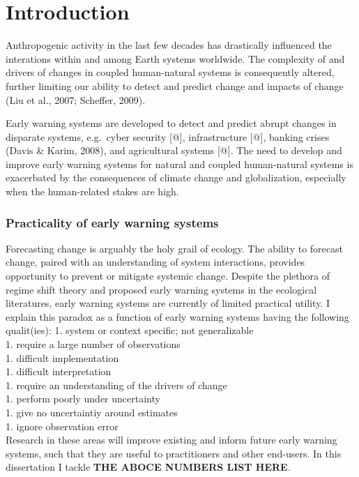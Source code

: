 \documentclass[12pt,twoside]{reedthesis}
\begin{document}
\hypertarget{intro-chapter}{%
\chapter{Introduction}\label{intro-chapter}}

Anthropogenic activity in the last few decades has drastically influenced the interations within and among Earth systems worldwide. The complexity of and drivers of changes in coupled human-natural systems is consequently altered, further limiting our ability to detect and predict change and impacts of change (Liu et al., 2007; Scheffer, 2009).

Early warning systems are developed to detect and predict abrupt changes in disparate systems, e.g.~cyber security {[}@{]}, infrastructure {[}@{]}, banking crises (Davis \& Karim, 2008), and agricultural systems {[}@{]}. The need to develop and improve early warning systems for natural and coupled human-natural systems is exacerbated by the consequences of climate change and globalization, especially when the human-related stakes are high.

\hypertarget{practicality-of-early-warning-systems}{%
\subsection{Practicality of early warning systems}\label{practicality-of-early-warning-systems}}

Forecasting change is arguably the holy grail of ecology. The ability to forecast change, paired with an understanding of system interactions, provides opportunity to prevent or mitigate systemic change. Despite the plethora of regime shift theory and proposed early warning systems in the ecological literatures, early warning systems are currently of limited practical utility. I explain this paradox as a function of early warning systems having the following qualit(ies):
1. system or context specific; not generalizable\\
1. require a large number of observations\\
1. difficult implementation\\
1. difficult interpretation\\
1. require an understanding of the drivers of change\\
1. perform poorly under uncertainty\\
1. give no uncertaintiy around estimates\\
1. ignore observation error\\
Research in these areas will improve existing and inform future early warning systems, such that they are useful to practitioners and other end-users. In this dissertation I tackle \textbf{THE ABOCE NUMBERS LIST HERE}.
\end{document}
